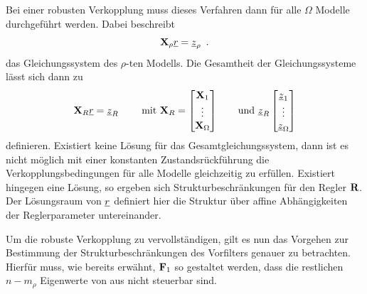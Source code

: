 Bei einer robusten Verkopplung muss dieses Verfahren dann für alle $\Omega$ Modelle durchgeführt werden. Dabei beschreibt 
\begin{equation}
	\textbf{X}_\rho\underline{r} = \underline{z}_\rho \, \, \, .
\end{equation}
das Gleichungssystem des $\rho$-ten Modells.
Die Gesamtheit der Gleichungssysteme lässt sich dann zu 
\begin{equation}\label{eq:GesGlSysM}
	\textbf{X}_R \underline{r} = \underline{z}_R \qquad \textnormal{ mit } \textbf{X}_R = 
	\begin{bmatrix}	\textbf{X}_1\\ \vdots\\ \textbf{X}_\Omega	\end{bmatrix}
	\qquad \textnormal{und }  \underline{z}_R
	\begin{bmatrix}	\underline{z}_1\\ \vdots\\ \underline{z}_\Omega	\end{bmatrix}
\end{equation}
definieren.
Existiert keine Lösung für das Gesamtgleichungssystem, dann ist es nicht möglich mit einer konstanten Zustandsrückführung die Verkopplungsbedingungen für alle Modelle gleichzeitig zu erfüllen.
Existiert hingegen eine Lösung, so ergeben sich Strukturbeschränkungen für den Regler $\textbf{R}$. 
Der Lösungsraum von $\underline{r}$ definiert hier die Struktur über affine Abhängigkeiten der Reglerparameter untereinander.

Um die robuste Verkopplung zu vervollständigen, gilt es nun das Vorgehen zur Bestimmung der Strukturbeschränkungen des Vorfilters genauer zu betrachten.
Hierfür muss, wie bereits erwähnt, $\textbf{F}_1$ so gestaltet werden, dass die restlichen $n-m_\rho$ Eigenwerte von  aus nicht steuerbar sind.

